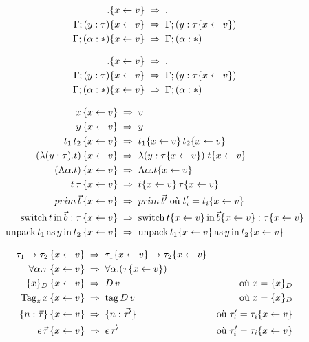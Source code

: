 \begin{align*}
                            . \{x \leftarrow v\} \;&\Rightarrow\; . \\
     \Gamma; (y : \tau) \{x \leftarrow v\} \;&\Rightarrow\; \Gamma; (y : \tau \{x \leftarrow v\}) \\
  \Gamma; (\alpha : *) \{x \leftarrow v\} \;&\Rightarrow\; \Gamma; (\alpha : *) 
\end{align*}

\begin{align*}
                            . \{x \leftarrow v\} \;&\Rightarrow\; . \\
     \Gamma; (y : \tau) \{x \leftarrow v\} \;&\Rightarrow\; \Gamma; (y : \tau \{x \leftarrow v\}) \\
  \Gamma; (\alpha : *) \{x \leftarrow v\} \;&\Rightarrow\; \Gamma; (\alpha : *) 
\end{align*}

\begin{align*}
  x
   \, \{x \leftarrow v\} \;&\Rightarrow\; v
    \\
  y
   \, \{x \leftarrow v\} \;&\Rightarrow\; y
    \\
  t_1 \, t_2
   \, \{x \leftarrow v\} \;&\Rightarrow\; t_1 \{x \leftarrow v\} \, t_2 \{x \leftarrow v\}
    \\
  (\lambda (y : \tau) . t)
   \, \{x \leftarrow v\} \;&\Rightarrow\; \lambda (y : \tau \{x \leftarrow v\}) . t \{x \leftarrow v\}
    \\
  (\Lambda \alpha . t)
   \, \{x \leftarrow v\} \;&\Rightarrow\; \Lambda \alpha . t \{x \leftarrow v\}
    \\
  t \, \tau
   \, \{x \leftarrow v\} \;&\Rightarrow\; t \{x \leftarrow v\} \, \tau \{x \leftarrow v\}
    \\
  prim \, \vec{t}
   \, \{x \leftarrow v\} \;&\Rightarrow\; prim \, \vec{t'} \; \text{où} \; t'_i = t_i \{x \leftarrow v\}
    \\
  \operatorname{switch} t \operatorname{in} \vec{b} : \tau
   \, \{x \leftarrow v\} \;&\Rightarrow\; 
  \operatorname{switch} t \{x \leftarrow v\} \operatorname{in} \vec{b} \{x \leftarrow v\} : \tau \{x \leftarrow v\} 
    \\
  \operatorname{unpack} t_1 \operatorname{as} y \operatorname{in} t_2
   \, \{x \leftarrow v\} \;&\Rightarrow\; 
  \operatorname{unpack} t_1 \{x \leftarrow v\} \operatorname{as} y \operatorname{in} t_2 \{x \leftarrow v\}
    \\
\end{align*}

\begin{align*}
  \tau_1 \rightarrow \tau_2
   \, \{x \leftarrow v\} \;&\Rightarrow\; 
    \tau_1 \{x \leftarrow v\} \rightarrow \tau_2 \{x \leftarrow v\}
  \\
  \forall \alpha. \tau
   \, \{x \leftarrow v\} \;&\Rightarrow\; 
  \forall \alpha. (\tau \{x \leftarrow v\})
  \\
  \{ x \}_D
   \, \{x \leftarrow v\} \;&\Rightarrow\; 
    D \, v
    &\text{où}\; x = \{ x \}_D
  \\
  \operatorname{Tag}_z x
   \, \{x \leftarrow v\} \;&\Rightarrow\; 
    \operatorname{tag} D \, v
    &\text{où}\; x = \{ x \}_D
  \\
  \{ n: \vec{\tau} \}
    \, \{x \leftarrow v\} \;&\Rightarrow\; 
    \{ n: \vec{\tau'} \}
    &\text{où}\; \tau'_i = \tau_i \{x \leftarrow v\}
  \\
  \epsilon \, \vec{\tau}
    \, \{x \leftarrow v\} \;&\Rightarrow\; \epsilon \, \vec{\tau'}
    &\text{où}\; \tau'_i = \tau_i \{x \leftarrow v\}
\end{align*}

